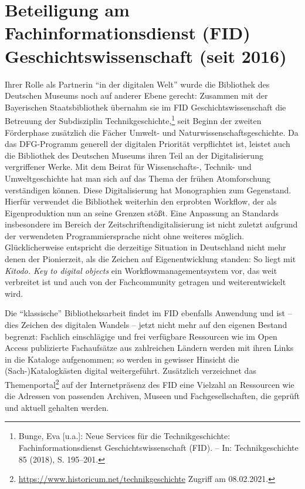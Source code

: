 \documentclass[a4paper,
fontsize=11pt,
oneside,
numbers=noperiodatend,
parskip=half-,
bibliography=totoc,
final
]{scrartcl}
\begin{document}
\hypertarget{beteiligung-am-fachinformationsdienst-fid-geschichtswissenschaft-seit-2016}{%
\section{Beteiligung am Fachinformationsdienst (FID)
Geschichtswissenschaft (seit
2016)}\label{beteiligung-am-fachinformationsdienst-fid-geschichtswissenschaft-seit-2016}}

Ihrer Rolle als Partnerin \enquote{in der digitalen Welt} wurde die
Bibliothek des Deutschen Museums noch auf anderer Ebene gerecht:
Zusammen mit der Bayerischen Staatsbibliothek übernahm sie im FID
Geschichtswissenschaft die Betreuung der Subdisziplin
Technikgeschichte,\footnote{Bunge, Eva {[}u.a.{]}: Neue Services für die
  Technikgeschichte: Fachinformationsdienst Geschichtswissenschaft
  (FID). -- In: Technikgeschichte 85 (2018), S. 195--201.} seit Beginn
der zweiten Förderphase zusätzlich die Fächer Umwelt- und
Naturwissenschaftsgeschichte. Da das DFG-Programm generell der digitalen
Priorität verpflichtet ist, leistet auch die Bibliothek des Deutschen
Museums ihren Teil an der Digitalisierung vergriffener Werke. Mit dem
Beirat für Wissenschafts-, Technik- und Umweltgeschichte hat man sich
auf das Thema der frühen Atomforschung verständigen können. Diese
Digitalisierung hat Monographien zum Gegenstand. Hierfür verwendet die
Bibliothek weiterhin den erprobten Workflow, der als Eigenproduktion nun
an seine Grenzen stößt. Eine Anpassung an Standards insbesondere im
Bereich der Zeitschriftendigitalisierung ist nicht zuletzt aufgrund der
verwendeten Programmiersprache nicht ohne weiteres möglich.
Glücklicherweise entspricht die derzeitige Situation in Deutschland
nicht mehr denen der Pionierzeit, als die Zeichen auf Eigenentwicklung
standen: So liegt mit \emph{Kitodo. Key to digital objects} ein
Workflowmanagementsystem vor, das weit verbreitet ist und auch von der
Fachcommunity getragen und weiterentwickelt wird.

Die \enquote{klassische} Bibliotheksarbeit findet im FID ebenfalls
Anwendung und ist -- dies Zeichen des digitalen Wandels -- jetzt nicht
mehr auf den eigenen Bestand begrenzt: Fachlich einschlägige und frei
verfügbare Ressourcen wie im Open Access publizierte Fachaufsätze aus
zahlreichen Ländern werden mit ihren Links in die Kataloge aufgenommen;
so werden in gewisser Hinsicht die (Sach-)Katalogkästen digital
weitergeführt. Zusätzlich verzeichnet das Themenportal\footnote{\url{https://www.historicum.net/technikgeschichte}
  Zugriff am 08.02.2021.} auf der Internetpräsenz des FID eine Vielzahl
an Ressourcen wie die Adressen von passenden Archiven, Museen und
Fachgesellschaften, die geprüft und aktuell gehalten werden.
\end{document}
